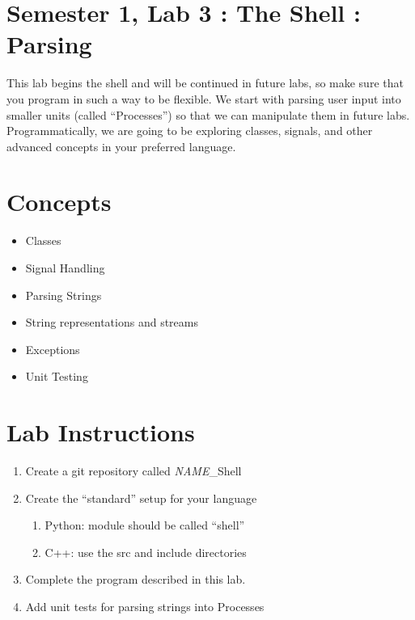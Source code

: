 \documentclass[12pt]{article}
\begin{document}
\section*{Semester 1, Lab 3 : The Shell : Parsing}
This lab begins the shell and will be continued in future labs, so make sure that you program in such a way to be flexible.  We start with parsing user input into smaller units (called ``Processes'') so that we can manipulate them in future labs.  Programmatically, we are going to be exploring classes, signals, and other advanced concepts in your preferred language.

\section*{Concepts}
\begin{itemize}
\item Classes
\item Signal Handling
\item Parsing Strings
\item String representations and streams
\item Exceptions
\item Unit Testing
\end{itemize}

\section*{Lab Instructions}
\begin{enumerate}
\item Create a git repository called {\em NAME}\_Shell
\item Create the ``standard'' setup for your language
	\begin{enumerate}
	\item Python: module should be called ``shell''
	\item C++: use the src and include directories
	\end{enumerate}
\item Complete the program described in this lab.
\item Add unit tests for parsing strings into Processes
\end{enumerate}
\end{document}
